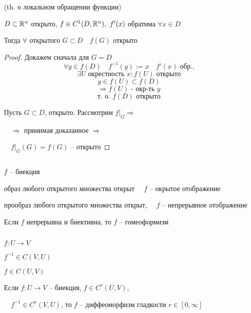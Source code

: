 



    
    \begin{corollary}
        (th. о локальном обращении функции) \hfill {}
        \par $D \subset \mathbb{R}^n$ открыто, $f \in C^1(D, \mathbb{R}^n), \ f'(x)$ обратима $\forall x \in D$
        \par Тогда $\forall$ открытого $G \subset D \quad f(G)$ открыто
    \end{corollary}
    \begin{proof}
        Докажем сначала для $G = D$
        \[ \forall y \in f(D) \quad f^{-1}(y) := x \quad f'(x) \text{ обр.,} \]
        \[ \exists U \text{ окрестность } x : f(U) \text{ открыто} \]
        \[ y \in f(U) \subset f(D) \]
        \[ \Rightarrow f(U) \text{ - окр-ть } y \]
        \[\text{т. о. } f(D) \text{ открыто}\]
        \par Пусть $G \subset D$, открыто. Рассмотрим $f\big|_G \Rightarrow$
        \par $\quad \Rightarrow$ принимая доказанное $\Rightarrow$
        \par $\quad f\big|_G(G) = f(G)$ -- открыто
    \end{proof}

    $ $
    \linebreak
    \par $f$ -- биекция
    \par образ любого открытого множества открыт $\quad f$ -- окрытое отображение
    \par прообраз любого открытого множества открыт, $\quad f$ -- непрерывное отображение

    \begin{definition}
        Если $f$ непрерывна и биективна, то $f$ -- гомеоформизм
    \end{definition}

    $ $
    \par $f : U \rightarrow V$
    \par $f^{-1} \in C(V, U)$
    \par $f \in C(U, V)$

    \begin{definition}
        Если $f : U \rightarrow V$ -- биекция, $f \in C^r(U, V)$,
        \par $\quad f^{-1} \in C^r(V, U)$, то $f$ -- диффеоморфизм гладкости $r \in [0, \infty]$
    \end{definition}

